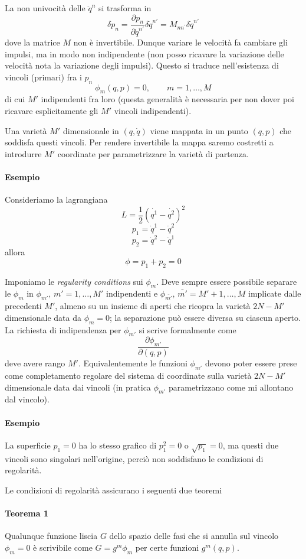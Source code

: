 \documentclass[a4paper, 11pt]{article}
\newcommand{\pderiv}[2]{\dfrac{\partial #1}{\partial #2}}
\begin{document}
	La non univocità delle $\ddot{q}^n$ si trasforma in
	\[ \delta p_n = \pderiv{p_n}{\dot{q}^{n'}} \delta \dot{q}^{n'} = M_{n n^{'}} \delta \dot{q}^{n'} \]
	dove la matrice $M$ non è invertibile. Dunque variare le velocità fa cambiare gli impulsi, ma in modo non indipendente (non posso ricavare la variazione delle velocità nota la variazione degli impulsi). Questo si traduce nell'esistenza di vincoli (primari) fra i $p_n$
	\[ \phi_m(q,p) = 0,\qquad m=1,\dots,M \]
	di cui $M'$ indipendenti fra loro (questa generalità è necessaria per non dover poi ricavare esplicitamente gli $M'$ vincoli indipendenti).
	
	Una varietà $M'$ dimensionale in $(q,\dot{q})$ viene mappata in un punto $(q,p)$ che soddisfa questi vincoli. Per rendere invertibile la mappa saremo costretti a introdurre $M'$ coordinate per parametrizzare la varietà di partenza.
	
	\paragraph{Esempio}
	Consideriamo la lagrangiana
	\[ L = \dfrac{1}{2} (\dot{q^1}-\dot{q^{2}})^2 \]
	\[ p_1 = \dot{q}^{1} - \dot{q}^{2} \]
	\[ p_2 = \dot{q}^{2} - \dot{q}^{1} \]
	allora
	\[ \phi = p_1 + p_2 = 0 \]
	
	Imponiamo le \emph{regularity conditions} sui $\phi_m$. Deve sempre essere possibile separare le $\phi_m$ in $\phi_{m'},\,m'=1,\dots,M'$ indipendenti e $\phi_{\bar{m'}},\, \bar{m'}=M'+1,\dots,M$ implicate dalle precedenti $M'$, almeno su un insieme di aperti che ricopra la varietà $2N-M'$ dimensionale data da $\phi_m=0$; la separazione può essere diversa su ciascun aperto.
	La richiesta di indipendenza per $\phi_{m'}$ si scrive formalmente come
	\[ \pderiv{\phi_{m'}}{(q,p)} \]
	deve avere rango $M'$. Equivalentemente le funzioni $\phi_{m'}$ devono poter essere prese come completamento regolare del sistema di coordinate sulla varietà $2N-M'$ dimensionale data dai vincoli (in pratica $\phi_{m'}$ parametrizzano come mi allontano dal vincolo).
	
	\paragraph{Esempio} La superficie $p_1=0$ ha lo stesso grafico di $p_1^2=0$ o $\sqrt{p_1}=0$, ma questi due vincoli sono singolari nell'origine, perciò non soddisfano le condizioni di regolarità.
	
	Le condizioni di regolarità assicurano i seguenti due teoremi
	\paragraph{Teorema 1} Qualunque funzione liscia $G$ dello spazio delle fasi che si annulla sul vincolo $\phi_m=0$ è scrivibile come
	$G = g^m \phi_m$ per certe funzioni $g^m(q,p)$.
\end{document}
